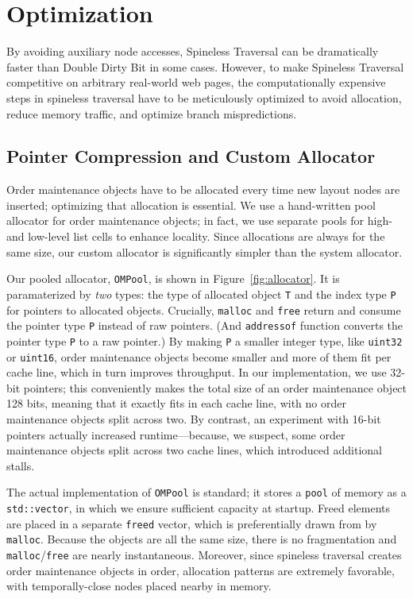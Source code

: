 \section{Optimization}
\label{sec:opt}

By avoiding auxiliary node accesses,
  Spineless Traversal can be
  dramatically faster than Double Dirty Bit
  in some cases.
However, to make Spineless Traversal competitive
  on arbitrary real-world web pages,
  the computationally expensive steps in spineless traversal
  have to be meticulously optimized
  to avoid allocation, reduce memory traffic,
  and optimize branch mispredictions.

\subsection{Pointer Compression and Custom Allocator}
Order maintenance objects have to be allocated every time
  new layout nodes are inserted;
  optimizing that allocation is essential.
We use a hand-written pool allocator for order maintenance objects;
  in fact, we use separate pools
  for high- and low-level list cells
  to enhance locality.
Since allocations are always for the same size,
  our custom allocator is significantly simpler than the system allocator.

Our pooled allocator, \texttt{OMPool},
  is shown in Figure~\ref{fig:allocator}.
It is paramaterized by \emph{two} types:
  the type of allocated object \texttt{T}
  and the index type \texttt{P} for pointers to allocated objects.
Crucially,
  \texttt{malloc} and \texttt{free} return and consume
  the pointer type \texttt{P} instead of raw pointers.
(And \texttt{addressof} function converts
  the pointer type \texttt{P} to a raw pointer.)
By making \texttt{P} a smaller integer type,
  like \texttt{uint32} or \texttt{uint16},
  order maintenance objects become smaller
  and more of them fit per cache line,
  which in turn improves throughput.
In our implementation, we use 32-bit pointers;
  this conveniently makes the total size
  of an order maintenance object 128 bits,
  meaning that it exactly fits in each cache line,
  with no order maintenance objects split across two.
By contrast, an experiment with 16-bit pointers
  actually increased runtime---because, we suspect,
  some order maintenance objects
  split across two cache lines,
  which introduced additional stalls.

The actual implementation of \texttt{OMPool} is standard;
  it stores a \texttt{pool} of memory as a \texttt{std::vector},
  in which we ensure sufficient capacity at startup.
Freed elements are placed in a separate \texttt{freed} vector,
  which is preferentially drawn from by \texttt{malloc}.
Because the objects are all the same size,
  there is no fragmentation and \texttt{malloc}/\texttt{free}
  are nearly instantaneous.
Moreover, since spineless traversal
  creates order maintenance objects in order,
  allocation patterns are extremely favorable,
  with temporally-close nodes placed nearby in memory.

